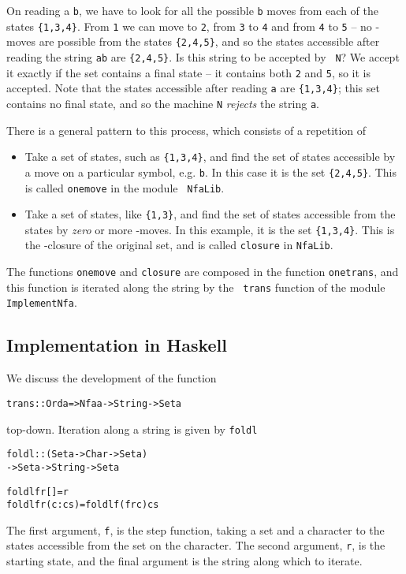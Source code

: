 \documentclass[11pt]{article}
\begin{document}
On reading a {\tt b}, we have to look for all the possible {\tt b} moves from
each of the states {\tt \{1,3,4\}}. From {\tt 1} we can move to {\tt 2}, from
{\tt 3} to {\tt 4} and from {\tt 4} to {\tt 5} -- no \eps-moves are possible
from the states {\tt \{2,4,5\}}, and so the states accessible after reading
the string {\tt ab} are {\tt \{2,4,5\}}. Is this string to be accepted by {\tt
N}?
We accept it exactly if the set contains a final state -- it contains both
{\tt 2} and {\tt 5}, so it is accepted. Note that the states accessible after
reading {\tt a} are {\tt \{1,3,4\}}; this set contains no final state, and so
the machine {\tt N} {\em rejects\/} the string {\tt a}.

There is a general pattern to this process, which consists of a repetition of
\begin{itemize}
\item Take a set of states, such as {\tt \{1,3,4\}}, and find the set of
states accessible by a move on a particular symbol, e.g. {\tt b}. In this case
it is the set {\tt \{2,4,5\}}. This is called {\tt onemove} in the module {\tt
NfaLib}.
\item Take a set of states, like {\tt \{1,3\}}, and find the
set of states accessible from the states by {\em zero\/} or more \eps-moves.
In this example, it is the set {\tt \{1,3,4\}}. This is the \eps-closure of
the original set, and is called {\tt closure} in {\tt NfaLib}.
\end{itemize}
The functions {\tt onemove} and {\tt closure} are composed in the function
{\tt onetrans}, and this function is iterated along the string by the {\tt
trans} function of the module {\tt ImplementNfa}.

\subsection*{Implementation in Haskell}

We discuss the development of the function
\begin{alltt}
trans :: Ord a => Nfa a -> String -> Set a
\end{alltt} 
top-down. Iteration along a string is given by {\tt foldl}
\begin{alltt}
foldl :: (Set a -> Char -> Set a)
                -> Set a -> String -> Set a
 
foldl f r []     = r
foldl f r (c:cs) = foldl f (f r c) cs
\end{alltt}
The first argument, {\tt f}, is the step function, taking a set and a
character to the states accessible from the set on the character. The second
argument, {\tt r},
is the starting state, and the final argument is the string along
which to iterate.
\end{document}
